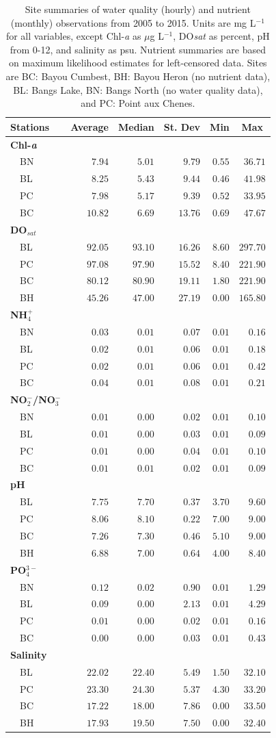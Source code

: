\documentclass[letterpaper,12pt]{article}\usepackage[]{graphicx}\usepackage[]{color}
\begin{document}
\begin{table}[!tbp]
\caption{Site summaries of water quality (hourly) and nutrient (monthly) observations from 2005 to 2015.  Units are mg L$^{-1}$ for all variables, except Chl-\textit{a} as $\mu$g L$^{-1}$, DO\textit{sat} as percent, pH from 0-12, and salinity as psu. Nutrient summaries are based on maximum likelihood estimates for left-censored data.  Sites are BC: Bayou Cumbest, BH: Bayou Heron (no nutrient data), BL: Bangs Lake, BN: Bangs North (no water quality data), and PC: Point aux Chenes.\label{tab:summtab}} 
\begin{center}
\begin{tabular}{lrrrrr}
\hline\hline
\multicolumn{1}{l}{Stations}&\multicolumn{1}{c}{Average}&\multicolumn{1}{c}{Median}&\multicolumn{1}{c}{St. Dev}&\multicolumn{1}{c}{Min}&\multicolumn{1}{c}{Max}\tabularnewline
\hline
{\bfseries Chl-\textit{a}}&&&&&\tabularnewline
~~BN&$ 7.94$&$ 5.01$&$ 9.79$&$0.55$&$ 36.71$\tabularnewline
~~BL&$ 8.25$&$ 5.43$&$ 9.44$&$0.46$&$ 41.98$\tabularnewline
~~PC&$ 7.98$&$ 5.17$&$ 9.39$&$0.52$&$ 33.95$\tabularnewline
~~BC&$10.82$&$ 6.69$&$13.76$&$0.69$&$ 47.67$\tabularnewline
\hline
{\bfseries DO$_{sat}$}&&&&&\tabularnewline
~~BL&$92.05$&$93.10$&$16.26$&$8.60$&$297.70$\tabularnewline
~~PC&$97.08$&$97.90$&$15.52$&$8.40$&$221.90$\tabularnewline
~~BC&$80.12$&$80.90$&$19.11$&$1.80$&$221.90$\tabularnewline
~~BH&$45.26$&$47.00$&$27.19$&$0.00$&$165.80$\tabularnewline
\hline
{\bfseries NH$_4^+$}&&&&&\tabularnewline
~~BN&$ 0.03$&$ 0.01$&$ 0.07$&$0.01$&$  0.16$\tabularnewline
~~BL&$ 0.02$&$ 0.01$&$ 0.06$&$0.01$&$  0.18$\tabularnewline
~~PC&$ 0.02$&$ 0.01$&$ 0.06$&$0.01$&$  0.42$\tabularnewline
~~BC&$ 0.04$&$ 0.01$&$ 0.08$&$0.01$&$  0.21$\tabularnewline
\hline
{\bfseries NO$_2^-$/NO$_3^-$}&&&&&\tabularnewline
~~BN&$ 0.01$&$ 0.00$&$ 0.02$&$0.01$&$  0.10$\tabularnewline
~~BL&$ 0.01$&$ 0.00$&$ 0.03$&$0.01$&$  0.09$\tabularnewline
~~PC&$ 0.01$&$ 0.00$&$ 0.04$&$0.01$&$  0.10$\tabularnewline
~~BC&$ 0.01$&$ 0.01$&$ 0.02$&$0.01$&$  0.09$\tabularnewline
\hline
{\bfseries pH}&&&&&\tabularnewline
~~BL&$ 7.75$&$ 7.70$&$ 0.37$&$3.70$&$  9.60$\tabularnewline
~~PC&$ 8.06$&$ 8.10$&$ 0.22$&$7.00$&$  9.00$\tabularnewline
~~BC&$ 7.26$&$ 7.30$&$ 0.46$&$5.10$&$  9.00$\tabularnewline
~~BH&$ 6.88$&$ 7.00$&$ 0.64$&$4.00$&$  8.40$\tabularnewline
\hline
{\bfseries PO$_4^{3-}$}&&&&&\tabularnewline
~~BN&$ 0.12$&$ 0.02$&$ 0.90$&$0.01$&$  1.29$\tabularnewline
~~BL&$ 0.09$&$ 0.00$&$ 2.13$&$0.01$&$  4.29$\tabularnewline
~~PC&$ 0.01$&$ 0.00$&$ 0.02$&$0.01$&$  0.16$\tabularnewline
~~BC&$ 0.00$&$ 0.00$&$ 0.03$&$0.01$&$  0.43$\tabularnewline
\hline
{\bfseries Salinity}&&&&&\tabularnewline
~~BL&$22.02$&$22.40$&$ 5.49$&$1.50$&$ 32.10$\tabularnewline
~~PC&$23.30$&$24.30$&$ 5.37$&$4.30$&$ 33.20$\tabularnewline
~~BC&$17.22$&$18.00$&$ 7.86$&$0.00$&$ 33.50$\tabularnewline
~~BH&$17.93$&$19.50$&$ 7.50$&$0.00$&$ 32.40$\tabularnewline
\hline
\end{tabular}\end{center}
\end{table}
\end{document}
